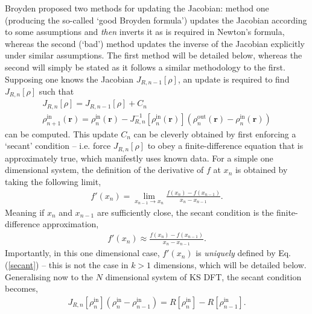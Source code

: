 
Broyden proposed two methods for updating the Jacobian: method one (producing the so-called `good Broyden formula') updates the Jacobian according to some assumptions and \textit{then} inverts it as is required in Newton's formula, whereas the second (`bad') method updates the inverse of the Jacobian explicitly under similar assumptions. The first method will be detailed below, whereas the second will simply be stated as it follows a similar methodology to the first. Supposing one knows the Jacobian $J_{R, n-1}[\rho]$, an update is required to find $J_{R, n}[\rho]$ such that
\begin{gather}
J_{R, n}[\rho] = J_{R, n-1}[\rho] + C_n \\
\rho^{\text{in}}_{n+1}(\textbf{r}) = \rho^{\text{in}}_{n}(\textbf{r}) - J^{-1}_{R,n}[\rho^{\text{in}}_n(\textbf{r})] (\rho^{\text{out}}_n (\textbf{r}) - \rho^{\text{in}}_n (\textbf{r})) 
\end{gather}
can be computed. This update $C_n$ can be cleverly obtained by first enforcing a `secant' condition -- i.e. force $J_{R,n}[\rho]$ to obey a finite-difference equation that is approximately true, which manifestly uses known data. For a simple one dimensional system, the definition of the derivative of $f$ at $x_n$ is obtained by taking the following limit,
\begin{gather}
f'(x_n) = \lim_{x_{n-1} \rightarrow x_n} \frac{f(x_n) - f(x_{n-1})}{x_n - x_{n-1}}.
\end{gather}
Meaning if $x_n$ and $x_{n-1}$ are sufficiently close, the secant condition is the finite-difference approximation, 
\begin{gather}
\label{secant}
f'(x_n) \approx \frac{f(x_n) - f(x_{n-1})}{x_n - x_{n-1}}.
\end{gather}
Importantly, in this one dimensional case, $f'(x_n)$ is \textit{uniquely} defined by Eq$.$ (\ref{secant}) -- this is not the case in $k>1$ dimensions, which will be detailed below. Generalising now to the $N$ dimensional system of KS DFT, the secant condition becomes,
\begin{gather}
\label{secant2}
J_{R,n}[\rho^{\text{in}}_{n}] (\rho^{\text{in}}_{n} - \rho^{\text{in}}_{n-1})= R[\rho^{\text{in}}_{n}] - R[\rho^{\text{in}}_{n-1}].
\end{gather}
